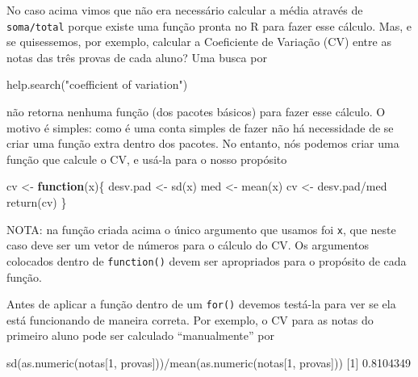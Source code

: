 \documentclass[
  10pt,
  a4paper]{book}
\newenvironment{Shaded}{\begin{snugshade}}{\end{snugshade}}
\newcommand{\ControlFlowTok}[1]{\textcolor[rgb]{0.13,0.29,0.53}{\textbf{#1}}}
\newcommand{\DecValTok}[1]{\textcolor[rgb]{0.00,0.00,0.81}{#1}}
\newcommand{\FloatTok}[1]{\textcolor[rgb]{0.00,0.00,0.81}{#1}}
\newcommand{\FunctionTok}[1]{\textcolor[rgb]{0.00,0.00,0.00}{#1}}
\newcommand{\NormalTok}[1]{#1}
\newcommand{\OtherTok}[1]{\textcolor[rgb]{0.56,0.35,0.01}{#1}}
\newcommand{\SpecialCharTok}[1]{\textcolor[rgb]{0.00,0.00,0.00}{#1}}
\newcommand{\StringTok}[1]{\textcolor[rgb]{0.31,0.60,0.02}{#1}}
\begin{document}
No caso acima vimos que não era necessário calcular a média através
de \texttt{soma/total} porque existe uma função pronta no R para fazer esse
cálculo. Mas, e se quisessemos, por exemplo, calcular a Coeficiente de
Variação (CV) entre as notas das três provas de cada aluno? Uma busca
por

\begin{Shaded}
\begin{Highlighting}[]
\FunctionTok{help.search}\NormalTok{(}\StringTok{"coefficient of variation"}\NormalTok{)}
\end{Highlighting}
\end{Shaded}

não retorna nenhuma função (dos pacotes básicos) para fazer esse
cálculo. O motivo é simples: como é uma conta simples de fazer não há
necessidade de se criar uma função extra dentro dos pacotes. No entanto,
nós podemos criar uma função que calcule o CV, e usá-la para o nosso
propósito

\begin{Shaded}
\begin{Highlighting}[]
\NormalTok{cv }\OtherTok{\textless{}{-}} \ControlFlowTok{function}\NormalTok{(x)\{}
\NormalTok{    desv.pad }\OtherTok{\textless{}{-}} \FunctionTok{sd}\NormalTok{(x)}
\NormalTok{    med }\OtherTok{\textless{}{-}} \FunctionTok{mean}\NormalTok{(x)}
\NormalTok{    cv }\OtherTok{\textless{}{-}}\NormalTok{ desv.pad}\SpecialCharTok{/}\NormalTok{med}
    \FunctionTok{return}\NormalTok{(cv)}
\NormalTok{\}}
\end{Highlighting}
\end{Shaded}

NOTA: na função criada acima o único argumento que usamos foi \texttt{x}, que
neste caso deve ser um vetor de números para o cálculo do CV. Os
argumentos colocados dentro de \texttt{function()} devem ser apropriados para
o propósito de cada função.

Antes de aplicar a função dentro de um \texttt{for()} devemos testá-la para ver
se ela está funcionando de maneira correta. Por exemplo, o CV para as
notas do primeiro aluno pode ser calculado ``manualmente'' por

\begin{Shaded}
\begin{Highlighting}[]
\FunctionTok{sd}\NormalTok{(}\FunctionTok{as.numeric}\NormalTok{(notas[}\DecValTok{1}\NormalTok{, provas]))}\SpecialCharTok{/}\FunctionTok{mean}\NormalTok{(}\FunctionTok{as.numeric}\NormalTok{(notas[}\DecValTok{1}\NormalTok{, provas]))}
\NormalTok{[}\DecValTok{1}\NormalTok{] }\FloatTok{0.8104349}
\end{Highlighting}
\end{Shaded}
\end{document}
